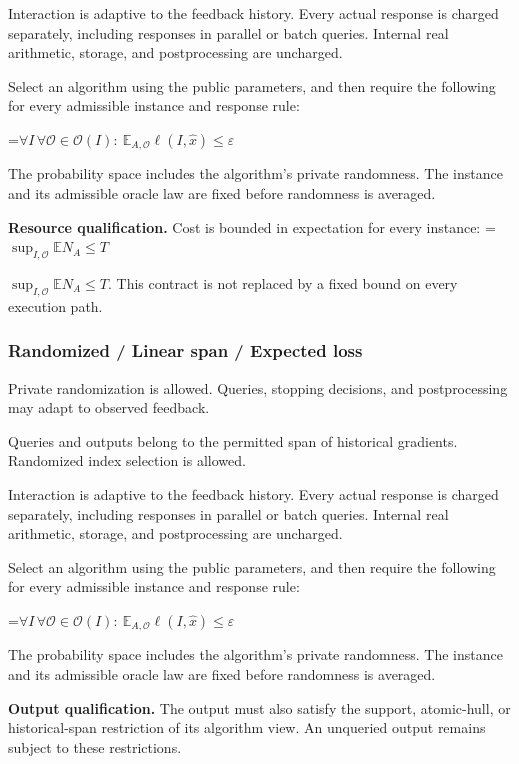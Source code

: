 \documentclass[10pt,a4paper]{article}
\newcommand{\AtlasMath}[1]{\par\begingroup\centering\setbox0=\hbox{$\displaystyle #1$}\ifdim\wd0>1.4\linewidth\typeout{ATLAS WIDE FORMULA: \the\wd0}\fi\ifdim\wd0>\linewidth\resizebox{\linewidth}{!}{\box0}\else\box0\fi\par\endgroup}
\newcommand{\AtlasInlineMath}[1]{\begingroup\setbox0=\hbox{$#1$}\ifdim\wd0>.4\linewidth\endgroup\AtlasMath{#1}\else\endgroup$#1$\fi}
\begin{document}
Interaction is adaptive to the feedback history. Every actual response is charged separately, including responses in parallel or batch queries. Internal real arithmetic, storage, and postprocessing are uncharged.

Select an algorithm using the public parameters, and then require the following for every admissible instance and response rule:


\AtlasMath{\forall I\,\forall\mathcal{O}\in\mathcal{O}(I):\ \mathbb{E}_{A,\mathcal{O}}\ell(I,\widehat{x})\le\varepsilon}


The probability space includes the algorithm's private randomness. The instance and its admissible oracle law are fixed before randomness is averaged.

\textbf{Resource qualification.} Cost is bounded in expectation for every instance: \AtlasInlineMath{\sup_{I,\mathcal O}\mathbb E N_A\le T}. This contract is not replaced by a fixed bound on every execution path.

\subsubsection{Randomized / Linear span / Expected loss}
Private randomization is allowed. Queries, stopping decisions, and postprocessing may adapt to observed feedback.

Queries and outputs belong to the permitted span of historical gradients. Randomized index selection is allowed.

Interaction is adaptive to the feedback history. Every actual response is charged separately, including responses in parallel or batch queries. Internal real arithmetic, storage, and postprocessing are uncharged.

Select an algorithm using the public parameters, and then require the following for every admissible instance and response rule:


\AtlasMath{\forall I\,\forall\mathcal{O}\in\mathcal{O}(I):\ \mathbb{E}_{A,\mathcal{O}}\ell(I,\widehat{x})\le\varepsilon}


The probability space includes the algorithm's private randomness. The instance and its admissible oracle law are fixed before randomness is averaged.

\textbf{Output qualification.} The output must also satisfy the support, atomic-hull, or historical-span restriction of its algorithm view. An unqueried output remains subject to these restrictions.
\end{document}
